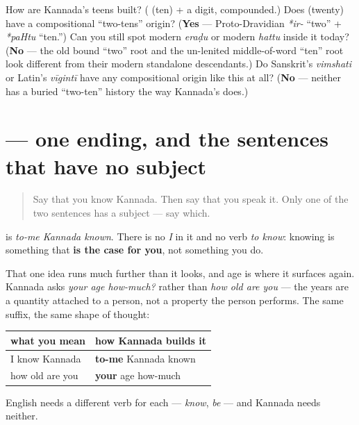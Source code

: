 \begin{tcolorbox}[breakable,colback=teal!4,colframe=teal!35!black,title={Before you move on}]
How are Kannada's teens built? (\textbf{} (ten) + a digit, compounded.) Does \textbf{} (twenty) have a compositional \textquotedblleft{}two-tens\textquotedblright{} origin? (\textbf{Yes} — Proto-Dravidian \emph{*ir-} \textquotedblleft{}two\textquotedblright{} + \emph{*paHtu} \textquotedblleft{}ten.\textquotedblright{}) Can you still spot modern \emph{eraḍu} or modern \emph{hattu} inside it today? (\textbf{No} — the old bound \textquotedblleft{}two\textquotedblright{} root and the un-lenited middle-of-word \textquotedblleft{}ten\textquotedblright{} root look different from their modern standalone descendants.) Do Sanskrit's \emph{vimshati} or Latin's \emph{vīgintī} have any compositional origin like this at all? (\textbf{No} — neither has a buried \textquotedblleft{}two-ten\textquotedblright{} history the way Kannada's does.)
\end{tcolorbox}
\section[\texorpdfstring{\kn{ನನಗೆ} \kn{ಕನ್ನಡ} \kn{ಗೊತ್ತು} (nanage kannaḍa gottu)}{ನನಗೆ ಕನ್ನಡ ಗೊತ್ತು (nanage kannaḍa gottu)}]{ — one ending, and the sentences that have no subject}

\label{lesson:KA-R20-second-pass-what-the-dative-carries}



\begin{quote}
Say that you know Kannada. Then say that you speak it. Only one of the two sentences has a subject — say which.
\end{quote}

\begin{culture}
\textbf{  } is \emph{to-me Kannada known}. There is no \emph{I} in it and no verb \emph{to know}: knowing is something that \textbf{is the case for you}, not something you do.

That one idea runs much further than it looks, and age is where it surfaces again. Kannada asks \emph{your age how-much?} rather than \emph{how old are you} — the years are a quantity attached to a person, not a property the person performs. The same suffix, the same shape of thought:

\noindent
\begin{tabularx}{\linewidth}{@{}>{\raggedright\arraybackslash}X>{\raggedright\arraybackslash}X@{}}
\toprule
\textbf{what you mean} & \textbf{how Kannada builds it} \\
\midrule
I know Kannada & \textbf{to-me} Kannada known \\
how old are you & \textbf{your} age how-much \\
\bottomrule
\end{tabularx}

English needs a different verb for each — \emph{know}, \emph{be} — and Kannada needs neither.
\end{culture}

